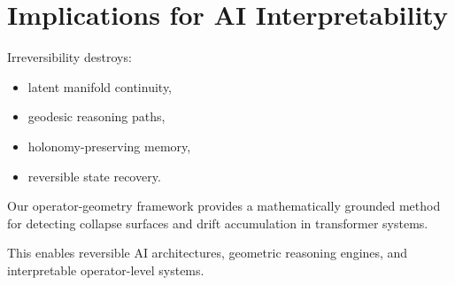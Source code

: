\section*{Implications for AI Interpretability}

Irreversibility destroys:
\begin{itemize}
    \item latent manifold continuity,
    \item geodesic reasoning paths,
    \item holonomy-preserving memory,
    \item reversible state recovery.
\end{itemize}

Our operator-geometry framework provides a mathematically grounded method for
detecting collapse surfaces and drift accumulation in transformer systems.

This enables reversible AI architectures, geometric reasoning engines, and
interpretable operator-level systems.
